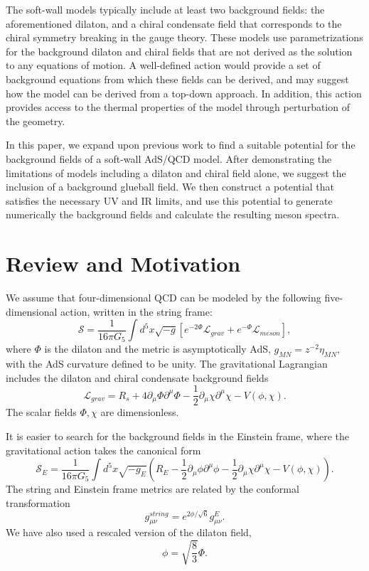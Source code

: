 \documentclass[12pt]{article}
\newcommand{\be}{\begin{equation}}
\newcommand{\ee}{\end{equation}}
\def\thalf{{\textstyle{\frac{1}{2}}}}
\newcommand{\cL}{\mathcal L}
\newcommand{\cS}{\mathcal S}
\begin{document}
The soft-wall models typically include at least two background fields: the aforementioned dilaton, and a chiral condensate field that corresponds to the chiral symmetry breaking in the gauge theory.
These models use parametrizations for the background dilaton and chiral fields that are not derived as the solution to any equations of motion. 
A well-defined action would provide a set of background equations from which these fields can be derived, and may suggest how the model can be derived from a top-down approach. 
In addition, this action provides access to the thermal properties of the model through perturbation of the geometry.

In this paper, we expand upon previous work to find a suitable potential for the background fields of a soft-wall AdS/QCD model. 
After demonstrating the limitations of models including a dilaton and chiral field alone, we suggest the inclusion of a background glueball field. 
We then construct a potential that satisfies the necessary UV and IR limits, and use this potential to generate numerically the background fields and calculate the resulting meson spectra.


\section{Review and Motivation}\label{secReview}

We assume that four-dimensional QCD can be modeled by the following five-dimensional action, written in the string frame:
\be
\cS =\frac{1}{16\pi G_5} \int d^5x \sqrt{-g} \left[ e^{-2\Phi} \cL_{grav} + e^{-\Phi} \cL_{meson} \right], 
\label{eqStringAction}
\ee
where $\Phi$ is the dilaton and the metric is asymptotically AdS, $g_{MN}=z^{-2}\eta_{MN},$ with the AdS curvature defined to be unity.
The gravitational Lagrangian includes the dilaton and chiral condensate background fields
\be
\cL_{grav}=R_s+4\partial_\mu\Phi\partial^\mu\Phi - \thalf\partial_\mu\chi\partial^\mu\chi -V(\phi,\chi).
\ee
The scalar fields $\Phi,\chi$ are dimensionless. 

It is easier to search for the background fields in the Einstein frame, where the gravitational action takes the canonical form
\be
\cS_E=\frac{1}{16\pi G_5} \int d^5x \sqrt{-g_E}\left(R_E-\thalf\partial_\mu\phi\partial^\mu\phi -\thalf\partial_\mu\chi\partial^\mu\chi - V(\phi,\chi)\right).
\ee
The string and Einstein frame metrics are related by the conformal transformation
\be
g_{\mu\nu}^{string}=e^{2\phi/\sqrt{6}}g_{\mu\nu}^E.
\ee
We have also used a rescaled version of the dilaton field,
\be
\phi=\sqrt{\frac{8}{3}}\Phi.
\ee
\end{document}
